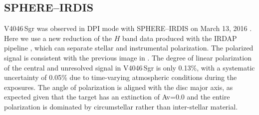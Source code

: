 \documentclass[fleqn,usenatbib,useAMS]{mnras}
\begin{document}

\subsection{SPHERE--IRDIS}  \label{subsec:SPHERE}

V4046\,Sgr was observed in DPI mode with SPHERE--IRDIS on March 13, 2016 \citep[see][for details]{Avenhaus_2018}. Here we use a new reduction of the $H$ band data produced with the IRDAP pipeline \citep{2020A&A...633A..64V}, which can separate stellar and instrumental polarization. The polarized signal is consistent with the previous image in \citet{Avenhaus_2018}. The degree of linear polarization of the central and unresolved signal in V4046\,Sgr is only 0.13\%, with a systematic uncertainty of 0.05\% due to time-varying atmospheric conditions during the exposures. The angle of polarization is aligned with the disc major axis, as expected given that the target has an extinction of Av=0.0 \citep{2016ApJ...828...69M} and the entire polarization is dominated by circumstellar rather than inter-stellar material.
\end{document}
